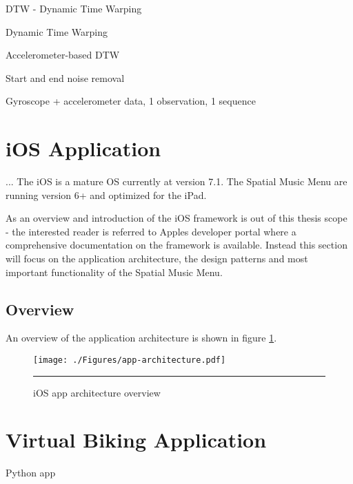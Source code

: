 DTW - Dynamic Time Warping 

Dynamic Time Warping \cite{salvador_toward_2007}

Accelerometer-based DTW \cite{akl_accelerometer-based_2010}

Start and end noise removal

Gyroscope + accelerometer data, 1 observation, 1 sequence


\section{iOS Application}
...
The iOS is a mature OS currently at version 7.1. The Spatial Music Menu are running version 6+ and optimized for the iPad.

As an overview and introduction of the iOS framework is out of this thesis scope - the interested reader is referred to Apples developer portal \cite{apple_apple_2014} where a comprehensive documentation on the framework is available. Instead this section will focus on the application architecture, the design patterns and most important functionality of the Spatial Music Menu.

\subsection{Overview}
An overview of the application architecture is shown in figure \ref{fig:apparchitecture}.

\begin{figure}[htbp]
	\centering
		\texttt{[image: ./Figures/app-architecture.pdf]}
		\rule{35em}{1pt}
	\caption[App architecture]{iOS app architecture overview}
	\label{fig:apparchitecture}
\end{figure}


\section{Virtual Biking Application}

Python app
